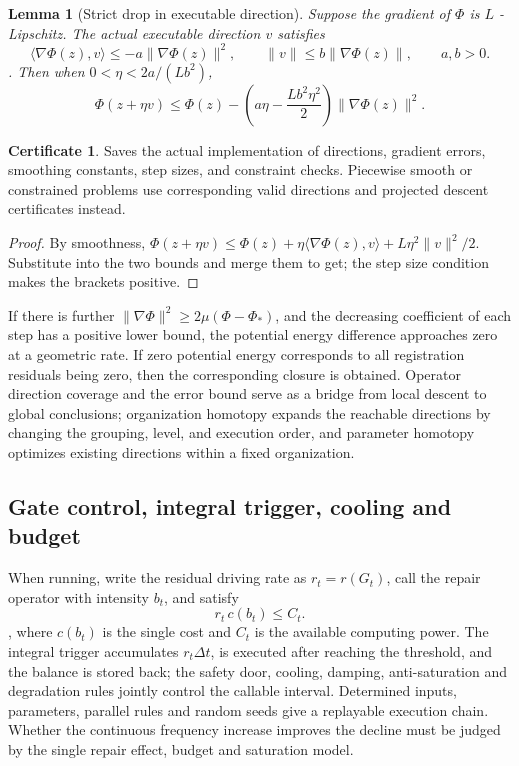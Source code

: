 \documentclass[11pt,a4paper]{article}
\theoremstyle{plain}
\newtheorem{lemma}[theorem]{Lemma}
\theoremstyle{definition}
\newtheorem*{certificate}{Certificate}
\theoremstyle{remark}
\begin{document}
\begin{CJK*}
\begin{lemma}
[Strict drop in executable direction]\label{ss:descent}
Suppose the gradient of $\Phi$ is $L$ -Lipschitz. The actual executable direction $v$ satisfies \[
 \langle\nabla\Phi(z),v\rangle\le-a\|\nabla\Phi(z)\|^2,
 \qquad \|v\|\le b\|\nabla\Phi(z)\|,
 \qquad a,b>0.
\]. Then when $0<\eta<2a/(Lb^2)$, \[
 \Phi(z+\eta v)\le\Phi(z)
 -\left(a\eta-\frac{Lb^2\eta^2}{2}\right)\|\nabla\Phi(z)\|^2.
\]\end{lemma}
\begin{certificate}
Saves the actual implementation of directions, gradient errors, smoothing constants, step sizes, and constraint checks. Piecewise smooth or constrained problems use corresponding valid directions and projected descent certificates instead.\end{certificate}
\begin{proof}
By smoothness, $\Phi(z+\eta v)\le\Phi(z)+\eta\langle\nabla\Phi(z),v\rangle+L\eta^2\|v\|^2/2$. Substitute into the two bounds and merge them to get; the step size condition makes the brackets positive.\end{proof}


If there is further $\|\nabla\Phi\|^2\ge2\mu(\Phi-\Phi_*)$, and the decreasing coefficient of each step has a positive lower bound, the potential energy difference approaches zero at a geometric rate. If zero potential energy corresponds to all registration residuals being zero, then the corresponding closure is obtained. Operator direction coverage and the error bound serve as a bridge from local descent to global conclusions; organization homotopy expands the reachable directions by changing the grouping, level, and execution order, and parameter homotopy optimizes existing directions within a fixed organization.

\subsection { Gate control, integral trigger, cooling and budget }

When running, write the residual driving rate as $r_t=r(G_t)$, call the repair operator with intensity $b_t$, and satisfy \[
 r_t\,c(b_t)\le C_t.
\], where $c(b_t)$ is the single cost and $C_t$ is the available computing power. The integral trigger accumulates $r_t\Delta t$, is executed after reaching the threshold, and the balance is stored back; the safety door, cooling, damping, anti-saturation and degradation rules jointly control the callable interval. Determined inputs, parameters, parallel rules and random seeds give a replayable execution chain. Whether the continuous frequency increase improves the decline must be judged by the single repair effect, budget and saturation model.


\end{CJK*}
\end{document}
